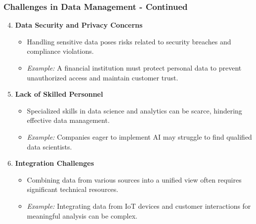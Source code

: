 \documentclass[aspectratio=169]{beamer}
\begin{document}
\begin{frame}[fragile]
    \frametitle{Challenges in Data Management - Continued}
    \begin{enumerate}
        \setcounter{enumi}{3}
        \item \textbf{Data Security and Privacy Concerns}
        \begin{itemize}
            \item Handling sensitive data poses risks related to security breaches and compliance violations.
            \item \textit{Example:} A financial institution must protect personal data to prevent unauthorized access and maintain customer trust.
        \end{itemize}

        \item \textbf{Lack of Skilled Personnel}
        \begin{itemize}
            \item Specialized skills in data science and analytics can be scarce, hindering effective data management.
            \item \textit{Example:} Companies eager to implement AI may struggle to find qualified data scientists.
        \end{itemize}

        \item \textbf{Integration Challenges}
        \begin{itemize}
            \item Combining data from various sources into a unified view often requires significant technical resources.
            \item \textit{Example:} Integrating data from IoT devices and customer interactions for meaningful analysis can be complex.
        \end{itemize}
    \end{enumerate}
\end{frame}
\end{document}
